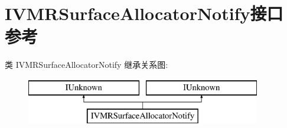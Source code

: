 \hypertarget{interface_i_v_m_r_surface_allocator_notify}{}\section{I\+V\+M\+R\+Surface\+Allocator\+Notify接口 参考}
\label{interface_i_v_m_r_surface_allocator_notify}
类 I\+V\+M\+R\+Surface\+Allocator\+Notify 继承关系图\+:\begin{figure}[H]
\begin{center}
\leavevmode
\includegraphics[height=2.000000cm]{interface_i_v_m_r_surface_allocator_notify}
\end{center}
\end{figure}
